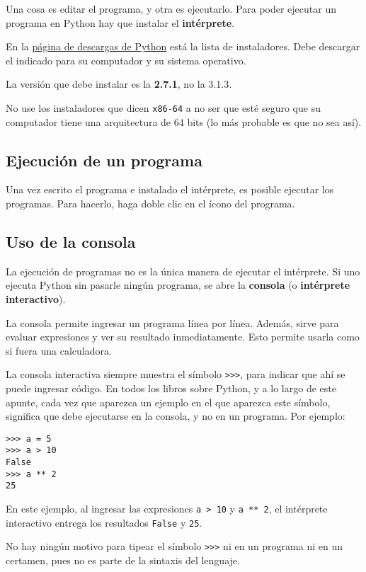 Una cosa es editar el programa, y otra es ejecutarlo. Para poder
ejecutar un programa en Python hay que instalar el \textbf{intérprete}.

En la \href{http://www.python.org/download/}{página de descargas de
Python} está la lista de instaladores. Debe descargar el indicado para
su computador y su sistema operativo.

La versión que debe instalar es la \textbf{2.7.1}, no la 3.1.3.

No use los instaladores que dicen \lstinline!x86-64! a no ser que esté
seguro que su computador tiene una arquitectura de 64 bits (lo más
probable es que no sea así).

\subsection{Ejecución de un programa}

Una vez escrito el programa e instalado el intérprete, es posible
ejecutar los programas. Para hacerlo, haga doble clic en el ícono del
programa.

\subsection{Uso de la consola}

La ejecución de programas no es la única manera de ejecutar el
intérprete. Si uno ejecuta Python sin pasarle ningún programa, se abre
la \textbf{consola} (o \textbf{intérprete interactivo}).

La consola permite ingresar un programa línea por línea. Además, sirve
para evaluar expresiones y ver su resultado inmediatamente. Esto permite
usarla como si fuera una calculadora.

La consola interactiva siempre muestra el símbolo \lstinline!>>>!, para
indicar que ahí se puede ingresar código. En todos los libros sobre
Python, y a lo largo de este apunte, cada vez que aparezca un ejemplo en
el que aparezca este símbolo, significa que debe ejecutarse en la
consola, y no en un programa. Por ejemplo:

\begin{lstlisting}
>>> a = 5
>>> a > 10
False
>>> a ** 2
25
\end{lstlisting}

En este ejemplo, al ingresar las expresiones \lstinline!a > 10! y
\lstinline!a ** 2!, el intérprete interactivo entrega los resultados
\lstinline!False! y \lstinline!25!.

No hay ningún motivo para tipear el símbolo \lstinline!>>>! ni en un
programa ni en un certamen, pues no es parte de la sintaxis del
lenguaje.

